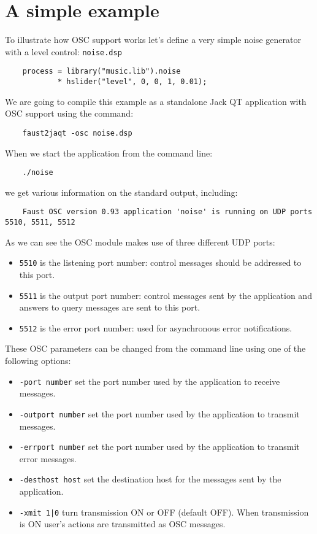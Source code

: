 \section{A simple example}

To illustrate how OSC support works let's define a very simple noise generator with a level control: \lstinline'noise.dsp'
\begin{lstlisting}
	process = library("music.lib").noise 
	        * hslider("level", 0, 0, 1, 0.01);
\end{lstlisting}
	
We are going to compile this example as a standalone Jack QT application with OSC support using the command:
\begin{lstlisting}
	faust2jaqt -osc noise.dsp
\end{lstlisting}

When we start the application from the command line:
\begin{lstlisting}
	./noise 
\end{lstlisting}
we get various information on the standard output, including:
\begin{lstlisting}
	Faust OSC version 0.93 application 'noise' is running on UDP ports 5510, 5511, 5512
\end{lstlisting}
As we can see the OSC module makes use of three different UDP ports:
\begin{itemize}
\item \lstinline'5510' is the listening port number: control messages should be addressed to this port.
\item \lstinline'5511' is the output port number: control messages sent by the application and answers to query messages are sent to this port.
\item \lstinline'5512' is the error port number: used for asynchronous error notifications.
\end{itemize}


These OSC parameters can be changed from the command line using one of the following options:
\begin{itemize}
\item \lstinline'-port number' set the port number used by the application to receive messages.
\item \lstinline'-outport number' set the port number used by the application to transmit messages.
\item \lstinline'-errport number' set the port number used by the application to transmit error messages.
\item \lstinline'-desthost host' set the destination host for the messages sent by the application.
\item \lstinline'-xmit 1|0' turn transmission ON or OFF (default OFF). When transmission is ON user's actions are transmitted as OSC messages.
\end{itemize}

